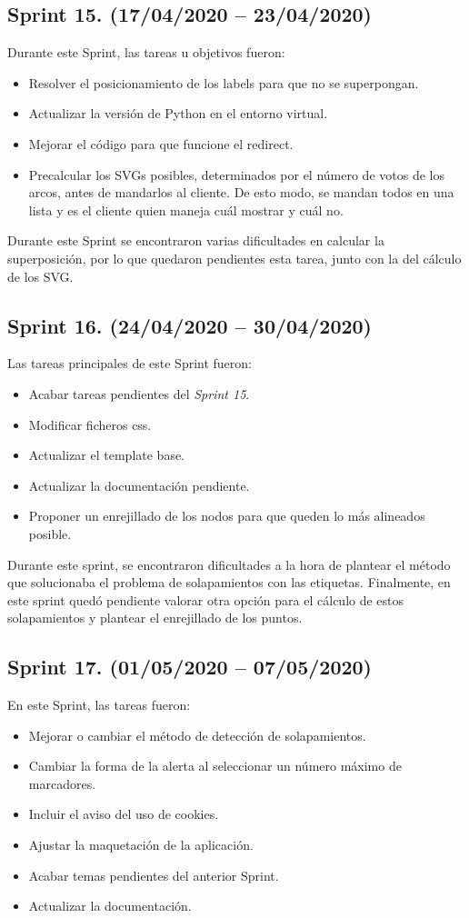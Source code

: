 \subsection{Sprint 15. (17/04/2020 -- 23/04/2020)}
Durante este Sprint, las tareas u objetivos fueron:
\begin{itemize}
	\item Resolver el posicionamiento de los labels para que no se superpongan.
	\item Actualizar la versión de Python en el entorno virtual.
	\item Mejorar el código para que funcione el redirect.
	\item Precalcular los SVGs posibles, determinados por el número de votos de los arcos, antes de mandarlos al cliente. De esto modo, se mandan todos en una lista y es el cliente quien maneja cuál mostrar y cuál no.
\end{itemize}
Durante este Sprint se encontraron varias dificultades en calcular la superposición, por lo que quedaron pendientes esta tarea, junto con la del cálculo de los SVG.

\subsection{Sprint 16. (24/04/2020 -- 30/04/2020)}
Las tareas principales de este Sprint fueron:
\begin{itemize}
	\item Acabar tareas pendientes del \textit{Sprint 15}.
	\item Modificar ficheros css.
	\item Actualizar el template base.
	\item Actualizar la documentación pendiente.
	\item Proponer un enrejillado de los nodos para que queden lo más alineados posible.
\end{itemize}
Durante este sprint, se encontraron dificultades a la hora de plantear el método que solucionaba el problema de solapamientos con las etiquetas. Finalmente, en este sprint quedó pendiente valorar otra opción para el cálculo de estos solapamientos y plantear el enrejillado de los puntos.

\subsection{Sprint 17. (01/05/2020 -- 07/05/2020)}
En este Sprint, las tareas fueron:
\begin{itemize}
	\item Mejorar o cambiar el método de detección de solapamientos.
	\item Cambiar la forma de la alerta al seleccionar un número máximo de marcadores.
	\item Incluir el aviso del uso de cookies.
	\item Ajustar la maquetación de la aplicación.
	\item Acabar temas pendientes del anterior Sprint.
	\item Actualizar la documentación.
\end{itemize}

